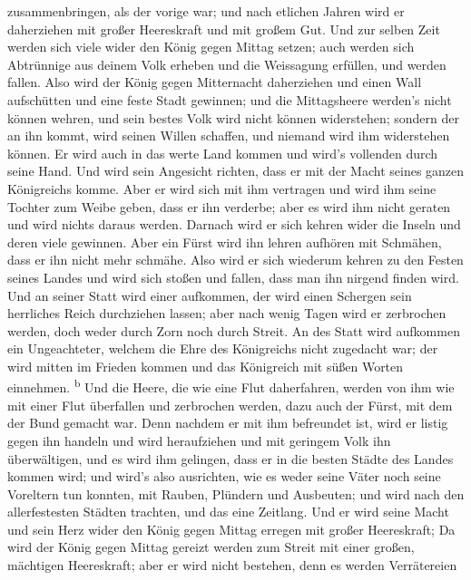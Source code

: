zusammenbringen, als der vorige war; und nach etlichen Jahren wird er
daherziehen mit großer Heereskraft und mit großem Gut. 
Und zur selben Zeit werden sich viele wider den König gegen Mittag
setzen; auch werden sich Abtrünnige aus deinem Volk erheben und die
Weissagung erfüllen, und werden fallen.  Also wird der
König gegen Mitternacht daherziehen und einen Wall aufschütten und eine
feste Stadt gewinnen; und die Mittagsheere werden's nicht können wehren,
und sein bestes Volk wird nicht können widerstehen; 
sondern der an ihn kommt, wird seinen Willen schaffen, und niemand wird
ihm widerstehen können. Er wird auch in das werte Land kommen und wird's
vollenden durch seine Hand.  Und wird sein Angesicht
richten, dass er mit der Macht seines ganzen Königreichs komme. Aber er
wird sich mit ihm vertragen und wird ihm seine Tochter zum Weibe geben,
dass er ihn verderbe; aber es wird ihm nicht geraten und wird nichts
daraus werden.  Darnach wird er sich kehren wider die
Inseln und deren viele gewinnen. Aber ein Fürst wird ihn lehren aufhören
mit Schmähen, dass er ihn nicht mehr schmähe.  Also wird
er sich wiederum kehren zu den Festen seines Landes und wird sich stoßen
und fallen, dass man ihn nirgend finden wird.  Und an
seiner Statt wird einer aufkommen, der wird einen Schergen sein
herrliches Reich durchziehen lassen; aber nach wenig Tagen wird er
zerbrochen werden, doch weder durch Zorn noch durch Streit.
 An des Statt wird aufkommen ein Ungeachteter, welchem
die Ehre des Königreichs nicht zugedacht war; der wird mitten im Frieden
kommen und das Königreich mit süßen Worten einnehmen.
\textsuperscript{b}  Und die Heere, die wie eine Flut
daherfahren, werden von ihm wie mit einer Flut überfallen und zerbrochen
werden, dazu auch der Fürst, mit dem der Bund gemacht war.
 Denn nachdem er mit ihm befreundet ist, wird er listig
gegen ihn handeln und wird heraufziehen und mit geringem Volk ihn
überwältigen,  und es wird ihm gelingen, dass er in die
besten Städte des Landes kommen wird; und wird's also ausrichten, wie es
weder seine Väter noch seine Voreltern tun konnten, mit Rauben, Plündern
und Ausbeuten; und wird nach den allerfestesten Städten trachten, und
das eine Zeitlang.  Und er wird seine Macht und sein Herz
wider den König gegen Mittag erregen mit großer Heereskraft; Da wird der
König gegen Mittag gereizt werden zum Streit mit einer großen, mächtigen
Heereskraft; aber er wird nicht bestehen, denn es werden Verrätereien
